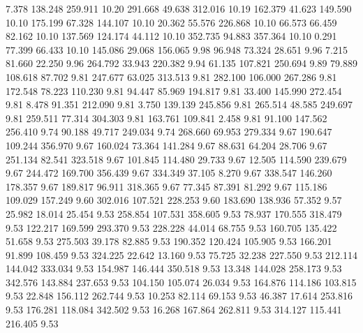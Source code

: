    7.378  138.248  259.911        10.20
 291.668   49.638  312.016        10.19
 162.379   41.623  149.590        10.10
 175.199   67.328  144.107        10.10
  20.362   55.576  226.868        10.10
  66.573   66.459   82.162        10.10
 137.569  124.174   44.112        10.10
 352.735   94.883  357.364        10.10
   0.291   77.399   66.433        10.10
 145.086   29.068  156.065         9.98
  96.948   73.324   28.651         9.96
   7.215   81.660   22.250         9.96
 264.792   33.943  220.382         9.94
  61.135  107.821  250.694         9.89
  79.889  108.618   87.702         9.81
 247.677   63.025  313.513         9.81
 282.100  106.000  267.286         9.81
 172.548   78.223  110.230         9.81
  94.447   85.969  194.817         9.81
  33.400  145.990  272.454         9.81
   8.478   91.351  212.090         9.81
   3.750  139.139  245.856         9.81
 265.514   48.585  249.697         9.81
 259.511   77.314  304.303         9.81
 163.761  109.841    2.458         9.81
  91.100  147.562  256.410         9.74
  90.188   49.717  249.034         9.74
 268.660   69.953  279.334         9.67
 190.647  109.244  356.970         9.67
 160.024   73.364  141.284         9.67
  88.631   64.204   28.706         9.67
 251.134   82.541  323.518         9.67
 101.845  114.480   29.733         9.67
  12.505  114.590  239.679         9.67
 244.472  169.700  356.439         9.67
 334.349   37.105    8.270         9.67
 338.547  146.260  178.357         9.67
 189.817   96.911  318.365         9.67
  77.345   87.391   81.292         9.67
 115.186  109.029  157.249         9.60
 302.016  107.521  228.253         9.60
 183.690  138.936   57.352         9.57
  25.982   18.014   25.454         9.53
 258.854  107.531  358.605         9.53
  78.937  170.555  318.479         9.53
 122.217  169.599  293.370         9.53
 228.228   44.014   68.755         9.53
 160.705  135.422   51.658         9.53
 275.503   39.178   82.885         9.53
 190.352  120.424  105.905         9.53
 166.201   91.899  108.459         9.53
 324.225   22.642   13.160         9.53
  75.725   32.238  227.550         9.53
 212.114  144.042  333.034         9.53
 154.987  146.444  350.518         9.53
  13.348  144.028  258.173         9.53
 342.576  143.884  237.653         9.53
 104.150  105.074   26.034         9.53
 164.876  114.186  103.815         9.53
  22.848  156.112  262.744         9.53
  10.253   82.114   69.153         9.53
  46.387   17.614  253.816         9.53
 176.281  118.084  342.502         9.53
  16.268  167.864  262.811         9.53
 314.127  115.441  216.405         9.53
